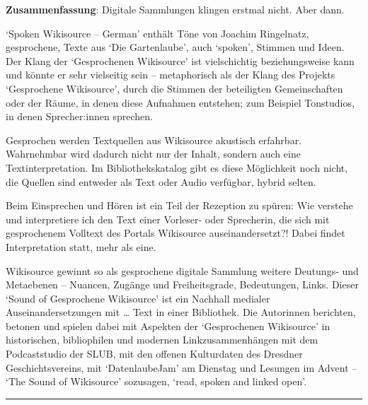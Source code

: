 \textbf{Zusammenfassung}: Digitale Sammlungen klingen erstmal nicht. Aber dann.

`Spoken Wikisource -- German' enthält Töne von Joachim Ringelnatz,
gesprochene, Texte aus `Die Gartenlaube', auch `spoken', Stimmen und
Ideen. Der Klang der `Gesprochenen Wikisource' ist vielschichtig
beziehungsweise kann und könnte er sehr vielseitig sein -- metaphorisch
als der Klang des Projekts `Gesprochene Wikisource', durch die Stimmen
der beteiligten Gemeinschaften oder der Räume, in denen diese Aufnahmen
entstehen; zum Beispiel Tonstudios, in denen Sprecher:innen sprechen.

Gesprochen werden Textquellen aus Wikisource akustisch erfahrbar.
Wahrnehmbar wird dadurch nicht nur der Inhalt, sondern auch eine
Textinterpretation. Im Bibliothekskatalog gibt es diese Möglichkeit noch
nicht, die Quellen sind entweder als Text oder Audio verfügbar, hybrid
selten.

Beim Einsprechen und Hören ist ein Teil der Rezeption zu spüren:
Wie verstehe und interpretiere ich den Text einer Vorleser- oder
Sprecherin, die sich mit gesprochenem Volltext des Portals Wikisource
auseinandersetzt?! Dabei findet Interpretation statt, mehr als eine.

Wikisource gewinnt so als gesprochene digitale Sammlung weitere
Deutungs- und Metaebenen -- Nuancen, Zugänge und Freiheitsgrade,
Bedeutungen, Links. Dieser `Sound of Gesprochene Wikisource' ist ein
Nachhall medialer Auseinandersetzungen mit \ldots{} Text in einer
Bibliothek. Die Autorinnen berichten, betonen und spielen dabei mit
Aspekten der `Gesprochenen Wikisource' in historischen, bibliophilen und
modernen Linkzusammenhängen mit dem Podcaststudio der SLUB, mit den
offenen Kulturdaten des Dresdner Geschichtsvereins, mit `DatenlaubeJam'
am Dienstag und Lesungen im Advent -- `The Sound of Wikisource'
sozusagen, `read, spoken and linked open'.

\begin{center}\rule{0.5\linewidth}{0.5pt}\end{center}
